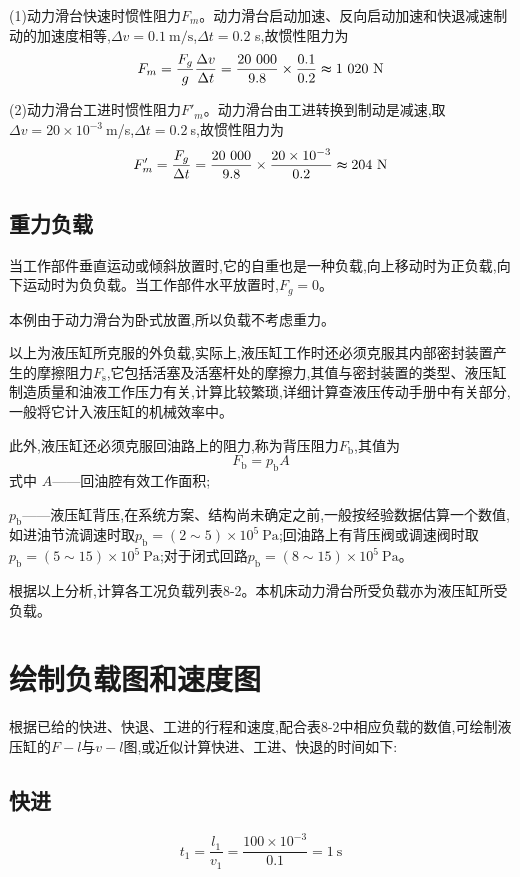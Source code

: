 (1)动力滑台快速时惯性阻力$F_m$。动力滑台启动加速、反向启动加速和快退减速制动的加速度相等,$\Delta v=0.1\ \text{m/s}$,$\Delta t=0.2$ s,故惯性阻力为
$$F_m=\frac{F_g}{g}\frac{\Delta v}{\Delta t}=\frac{20\ 000}{9.8}\times\frac{0.1}{0.2}\thickapprox 1\ 020\ \text{N}$$

(2)动力滑台工进时惯性阻力$F'_m$。动力滑台由工进转换到制动是减速,取$\Delta v=20\times 10^{-3}\ $m/s,$\Delta t=0.2\ $s,故惯性阻力为$$F'_m=\frac{F_g}{\Delta t}=\frac{20\ 000}{9.8}\times \frac{20\times 10^{-3}}{0.2}\thickapprox 204\ \text{N}$$

\subsection{重力负载}
当工作部件垂直运动或倾斜放置时,它的自重也是一种负载,向上移动时为正负载,向下运动时为负负载。当工作部件水平放置时,$F_g=0$。

本例由于动力滑台为卧式放置,所以负载不考虑重力。

以上为液压缸所克服的外负载,实际上,液压缸工作时还必须克服其内部密封装置产生的摩擦阻力$F_{\text{s}}$,它包括活塞及活塞杆处的摩擦力,其值与密封装置的类型、液压缸制造质量和油液工作压力有关,计算比较繁琐,详细计算查液压传动手册中有关部分,一般将它计入液压缸的机械效率中。

此外,液压缸还必须克服回油路上的阻力,称为背压阻力$F_{\text{b}}$,其值为
\begin{equation}
    F_{\text{b}}=p_{\text{b}}A
\end{equation}
式中
$A$——回油腔有效工作面积;

$p_{\text{b}}$——液压缸背压,在系统方案、结构尚未确定之前,一般按经验数据估算一个数值,如进油节流调速时取$p_{\text{b}}=(2\sim 5)\times 10^5\ \text{Pa}$;回油路上有背压阀或调速阀时取$p_{\text{b}}=(5\sim 15)\times 10^5\ \text{Pa}$;对于闭式回路$p_{\text{b}}=(8\sim 15)\times 10^5\ \text{Pa}$。

根据以上分析,计算各工况负载列表8-2。本机床动力滑台所受负载亦为液压缸所受负载。

\section{绘制负载图和速度图}
根据已给的快进、快退、工进的行程和速度,配合表8-2中相应负载的数值,可绘制液压缸的$F-l$与$v-l$图,或近似计算快进、工进、快退的时间如下:

\subsection{快进}
$$t_1=\frac{l_1}{v_1}=\frac{100\times 10^{-3}}{0.1}=1\ \text{s}$$

